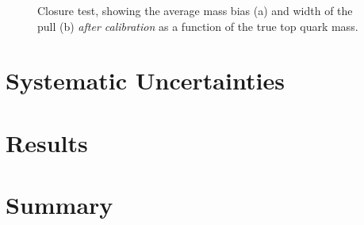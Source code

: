 \begin{figure}[!htp]
   \hspace{-1.cm}
   \caption{Closure test, showing the average mass bias (a) and width of the pull (b) {\em after calibration} as a
            function of the true top quark mass.
   \label{fig:calibrated_bias_pull_vs_mass}}
\end{figure}
 


\section{Systematic Uncertainties}
\label{s_top_mass:systematics}

\section{Results}
\label{s_top_mass:results}

\section{Summary}
\label{s_top_mass:summary}





